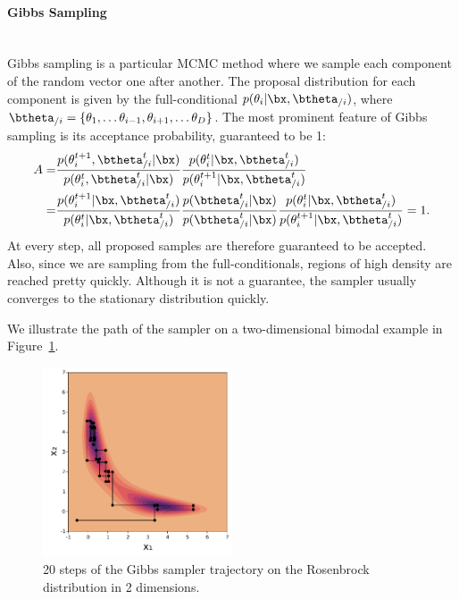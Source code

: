 \paragraph{Gibbs Sampling}\mbox{}\\
Gibbs sampling is a particular \ac{MCMC} method where we sample each component of the random vector one after another.
The proposal distribution for each component is given by the full-conditional  $p(\theta_i|\bx,\btheta_{/i})$, where $\btheta_{/i}=\{\theta_1, \ldots \theta_{i-1}, \theta_{i+1},\ldots \theta_{D}\}$.
The most prominent feature of Gibbs sampling is its acceptance probability, guaranteed to be 1:
\begin{align*}
    A =& \frac{p(\theta^{t+1}_i,\btheta^t_{/i}|\bx)}{p(\theta^t_i,\btheta^t_{/i}|\bx)}\frac{p(\theta^t_i|\bx,\btheta^{t}_{/i})}{p(\theta^{t+1}_i|\bx,\btheta^t_{/i})}\\
    =& \frac{p(\theta^{t+1}_i|\bx, \btheta^{t}_{/i})}{p(\theta^t_i|\bx,\btheta^t_{/i})}\frac{p(\btheta^t_{/i}|\bx)}{p(\btheta^t_{/i}|\bx)}\frac{p(\theta^t_i|\bx,\btheta^{t}_{/i})}{p(\theta^{t+1}_i|\bx,\btheta^t_{/i})} = 1.
\end{align*}
At every step, all proposed samples are therefore guaranteed to be accepted.
Also, since we are sampling from the full-conditionals, regions of high density are reached pretty quickly.
Although it is not a guarantee, the sampler usually converges to the stationary distribution quickly.

We illustrate the path of the sampler on a two-dimensional bimodal example in Figure~\ref{fig:gibbs_samp}.

\begin{figure}
\centering
\includegraphics[width=0.5\textwidth]{./chapters/2_background/figures/gibbs_sampling.pdf}
\caption{20 steps of the Gibbs sampler trajectory on the Rosenbrock distribution in 2 dimensions.}
\label{fig:gibbs_samp}
\end{figure}


